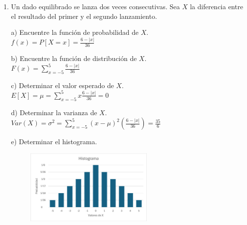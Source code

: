 \documentclass[a4paper, 12pt]{article}
\newcommand{\Aspace}{0.2cm}
\begin{document}
    \begin{enumerate}
        \item Un dado equilibrado se lanza dos veces consecutivas. Sea $X$ la diferencia entre el resultado del primer y el segundo lanzamiento.
            \vspace{\Aspace} \par
            a) Encuentre la función de probabilidad de $X$.
            \\ { \color{azul} $f(x) = P[X = x] = \frac{6 - |x|}{36}$ }

            \vspace{\Aspace} \par
            b) Encuentre la función de distribución de $X$.
            \\ { \color{azul} $F(x) = \sum\limits_{x = -5}^{5} \frac{6 - |x|}{36}$ }

            \vspace{\Aspace} \par
            c) Determinar el valor esperado de $X$.
            \\ { \color{azul} $E[X] = \mu = \sum\limits_{x = -5}^{5} x\frac{6 - |x|}{36} = 0$ }

            \vspace{\Aspace} \par
            d) Determinar la varianza de $X$.
            \\ { \color{azul} $Var(X) = \sigma^{2} = \sum\limits_{x = -5}^{5} (x - \mu)^{2} (\frac{6 - |x|}{36}) = \frac{35}{6}$ }

            \vspace{\Aspace} \par
            e) Determinar el histograma.
            \begin{figure}[h]
                \centering
                \includegraphics[width=0.6\textwidth]{./Assets/HistogramaT6P1.png}
            \end{figure}


\end{enumerate}
\end{document}

